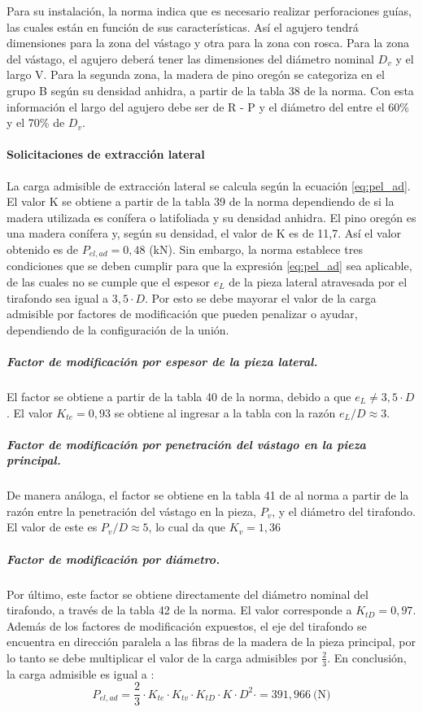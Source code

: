 Para su instalación, la norma indica que es necesario realizar perforaciones guías, las cuales están en función de sus características. Así el agujero tendrá dimensiones para la zona del vástago y otra para la zona con rosca. Para la zona del vástago, el agujero deberá tener las dimensiones del diámetro nominal $D_v$ y el largo V. Para la segunda zona, la madera de pino oregón se categoriza en el grupo B según su densidad anhidra, a partir de la tabla 38 de la norma. Con esta información el largo del agujero debe ser de R - P  y el diámetro del entre el 60\% y el 70\% de $D_v$.
\paragraph{Solicitaciones de extracción lateral}
La carga admisible de extracción lateral se calcula según la ecuación \ref{eq:pel_ad}. El valor K se obtiene a partir de la tabla 39 de la norma dependiendo de si la madera utilizada es conífera o latifoliada y su densidad anhidra. El pino oregón es una madera conífera y, según su densidad, el valor de K es de 11,7. Así el valor obtenido es de $P_{el,ad} = 0,48$ (kN). Sin embargo, la norma establece tres condiciones que se deben cumplir para que la expresión \ref{eq:pel_ad} sea aplicable, de las cuales no se cumple que el espesor $e_L$ de la pieza lateral atravesada por el tirafondo sea igual a $3,5\cdot D$. Por esto se debe mayorar el valor de la carga admisible por factores de modificación que pueden penalizar o ayudar, dependiendo de la configuración de la unión.

\subparagraph{Factor de modificación por espesor de la pieza lateral.}
El factor se obtiene a partir de la tabla 40 de la norma, debido a que $e_L \neq 3,5\cdot D$. El valor $K_{te}=0,93$ se obtiene al ingresar a la tabla con la razón $e_L/D \approx 3$.

\subparagraph{Factor de modificación por penetración del vástago en la pieza principal.}
De manera análoga, el factor se obtiene en la tabla 41 de al norma a partir de la razón entre la penetración del vástago en la pieza, $P_v$, y el diámetro del tirafondo. El valor de este es $P_v/D \approx 5$, lo cual da que $K_v=1,36$

\subparagraph{Factor de modificación por diámetro.}
Por último, este factor se obtiene directamente del diámetro nominal del tirafondo, a través de la tabla 42 de la norma. El valor corresponde a $K_{tD}=0,97$.
\\

Además de los factores de modificación expuestos, el eje del tirafondo se encuentra en dirección paralela a las fibras de la madera de la pieza principal, por lo tanto se debe multiplicar el valor de la carga admisibles por $\frac{2}{3}$. En conclusión, la carga admisible es igual a :
\begin{equation}
	P_{el,ad} = \frac{2}{3}\cdot K_{te}\cdot K_{tv}\cdot K_{tD} \cdot K\cdot D^2\cdot = 391,966 \: \text{(N)}
\end{equation}

